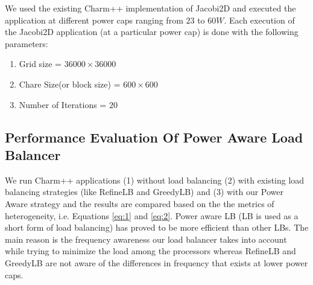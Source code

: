 We used the existing Charm++ implementation of Jacobi2D and executed the
application at different power caps ranging from $23$ to $60 W$.  Each
execution of the Jacobi2D application (at a particular power cap) is done with
the following parameters:

\begin{enumerate}
\item Grid size                   = $ 36000 \times 36000$
\item Chare Size(or block size)   = $600 \times 600$
\item Number of Iterations        = $20$
\end{enumerate}

\subsection{Performance Evaluation Of Power Aware Load Balancer} We run Charm++
  applications (1) without load balancing (2) with existing load balancing
  strategies (like  RefineLB and GreedyLB) and (3) with our Power Aware
  strategy and the results are compared based on the the metrics of
heterogeneity, i.e. Equations \eqref{eq:1} and \eqref{eq:2}.  Power aware LB
(LB is used as a short form of load balancing)
has proved to be more efficient than other LBs. The main reason is the
frequency awareness our load balancer takes into account while trying to
minimize the load among the processors whereas RefineLB and GreedyLB are not aware of the
differences in frequency that exists at lower power caps. 


